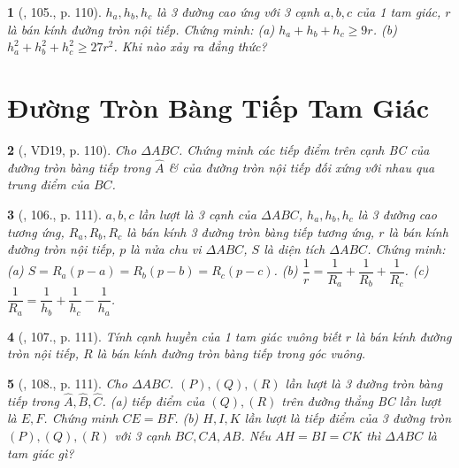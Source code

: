 \documentclass{article}
\newtheorem{baitoan}{}
\begin{document}
\begin{baitoan}[\cite{Binh_Toan_9_tap_1}, 105., p. 110]
	$h_a,h_b,h_c$ là 3 đường cao ứng với 3 cạnh $a,b,c$ của 1 tam giác, $r$ là bán kính đường tròn nội tiếp. Chứng minh: (a) $h_a + h_b + h_c\ge9r$. (b) $h_a^2 + h_b^2 + h_c^2\ge27r^2$. Khi nào xảy ra đẳng thức?
\end{baitoan}


\section{Đường Tròn Bàng Tiếp Tam Giác}

\begin{baitoan}[\cite{Binh_Toan_9_tap_1}, VD19, p. 110]
	Cho $\Delta ABC$. Chứng minh các tiếp điểm trên cạnh BC của đường tròn bàng tiếp trong $\widehat{A}$ \& của đường tròn nội tiếp đối xứng với nhau qua trung điểm của $BC$.
\end{baitoan}

\begin{baitoan}[\cite{Binh_Toan_9_tap_1}, 106., p. 111]
	$a,b,c$ lần lượt là 3 cạnh của $\Delta ABC$, $h_a,h_b,h_c$ là 3 đường cao tương ứng, $R_a,R_b,R_c$ là bán kính 3 đường tròn bàng tiếp tương ứng, $r$ là bán kính đường tròn nội tiếp, $p$ là nửa chu vi $\Delta ABC$, $S$ là diện tích $\Delta ABC$. Chứng minh: (a) $S = R_a(p - a) = R_b(p - b) = R_c(p - c)$. (b) $\dfrac{1}{r} = \dfrac{1}{R_a} + \dfrac{1}{R_b} + \dfrac{1}{R_c}$. (c) $\dfrac{1}{R_a} = \dfrac{1}{h_b} + \dfrac{1}{h_c} - \dfrac{1}{h_a}$.
\end{baitoan}

\begin{baitoan}[\cite{Binh_Toan_9_tap_1}, 107., p. 111]
	Tính cạnh huyền của 1 tam giác vuông biết $r$ là bán kính đường tròn nội tiếp, $R$ là bán kính đường tròn bàng tiếp trong góc vuông.
\end{baitoan}

\begin{baitoan}[\cite{Binh_Toan_9_tap_1}, 108., p. 111]
	Cho $\Delta ABC$. $(P),(Q),(R)$ lần lượt là 3 đường tròn bàng tiếp trong $\widehat{A},\widehat{B},\widehat{C}$. (a) tiếp điểm của $(Q),(R)$ trên đường thẳng BC lần lượt là $E,F$. Chứng minh $CE = BF$. (b) $H,I,K$ lần lượt là tiếp điểm của 3 đường tròn $(P),(Q),(R)$ với 3 cạnh $BC,CA,AB$. Nếu $AH = BI = CK$ thì $\Delta ABC$ là tam giác gì?
\end{baitoan}
\end{document}
